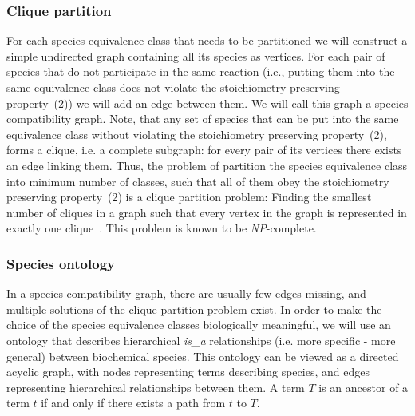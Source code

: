 \documentclass[10pt]{bmc_article}
\newenvironment{bmcformat}{\baselineskip20pt\sloppy\setboolean{publ}{false}}{\baselineskip20pt\sloppy}
\begin{document}
\begin{bmcformat}
\subsubsection*{Clique partition}
For each species equivalence class that needs to be partitioned we will construct a simple undirected graph containing all its species as vertices. For each pair of species that do not participate in the same reaction (i.e., putting them into the same equivalence class does not violate the stoichiometry preserving property~(2)) we will add an edge between them. We will call this graph a species compatibility graph. Note, that any set of species that can be put into the same equivalence class without violating the stoichiometry preserving property~(2), forms a clique, i.e. a complete subgraph: for every pair of its vertices there exists an edge linking them. Thus, the problem of partition the species equivalence class into minimum number of classes, such that all of them obey the stoichiometry preserving property~(2) is a clique partition problem: Finding the smallest number of cliques in a graph such that every vertex in the graph is represented in exactly one clique~\cite{Bhasker1991}. This problem is known to be \textit{NP}-complete. 


\subsubsection*{Species ontology}
In a species compatibility graph, there are usually few edges missing, and multiple solutions of the clique partition problem exist. In order to make the choice of the species equivalence classes biologically meaningful, we will use an ontology that describes hierarchical \textit{is\_a} relationships (i.e. more specific - more general) between biochemical species. This ontology can be viewed as a directed acyclic graph, with nodes representing terms describing species, and edges representing hierarchical relationships between them. A term $T$ is an ancestor of a term $t$ if and only if there exists a path from $t$ to $T$. 


\end{bmcformat}
\end{document}
